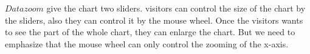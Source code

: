 \documentclass{article}
\begin{document}
	\begin{figure}[H]
		\centering
		
	\end{figure}
	\(Datazoom\) give the chart two sliders. visitors can control the size of the chart by the sliders, also they can control it by the mouse wheel. Once the visitors wants to see the part of the whole chart, they can enlarge the chart. But we need to emphasize that the mouse wheel can only control the zooming of the x-axis.
	\\
\end{document}
